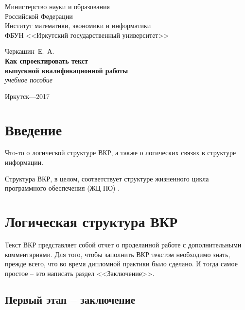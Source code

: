 \documentclass[a4paper,14pt,final]{extreport}
\begin{document}
\thispagestyle{empty}
\begin{center}
  \small Министерство науки и образования\\
  Российской Федерации \\
Институт математики, экономики и информатики\\
ФБУН <<Иркутский государственный университет>>
\end{center}
\vfill
\begin{center}
  Черкашин~Е.~А.\\[2em]
  {
  \Large\bfseries Как спроектировать текст\\
выпускной квалификационной работы\\
}
\vspace{1em}
\emph{учебное пособие}
\end{center}
\vspace{8em}
\vfill
\begin{center}
  Иркутск---2017
\end{center}
\mbox{}
\newpage

\tableofcontents

\chapter*{Введение}
\label{cha:inro}

Что-то о логической структуре ВКР, а также о логических связях в структуре информации.

Структура ВКР, в целом, соответствует структуре жизненного цикла программного обеспечения (ЖЦ ПО) \cite{lifecycle}.

\chapter{Логическая структура ВКР}
\label{cha:logstru}

Текст ВКР представляет собой отчет о проделанной работе с дополнительными комментариями.  Для того, чтобы заполнить ВКР текстом необходимо знать, прежде всего, что во время дипломной практики было сделано.  И тогда самое простое -- это написать раздел <<Заключение>>.

\section{Первый этап -- заключение}
\label{sec:coclusion}
\end{document}
